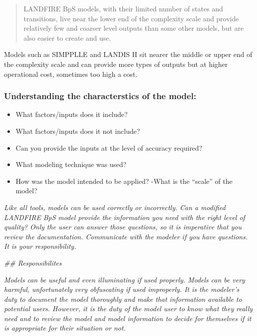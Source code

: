 \documentclass[
]{article}
\providecommand{\tightlist}{%
  \setlength{\itemsep}{0pt}\setlength{\parskip}{0pt}}
\begin{document}
\begin{quote}
LANDFIRE BpS models, with their limited number of states and
transitions, live near the lower end of the complexity scale and provide
relatively few and coarser level outputs than some other models, but are
also easier to create and use.
\end{quote}

Models such as SIMPPLLE and LANDIS II sit nearer the middle or upper end
of the complexity scale and can provide more types of outputs but at
higher operational cost, sometimes too high a cost.

\hypertarget{understanding-the-characterstics-of-the-model}{%
\subsubsection{Understanding the characterstics of the
model:}\label{understanding-the-characterstics-of-the-model}}

\begin{blue}

\begin{itemize}
\tightlist
\item
  What factors/inputs does it include?
\item
  What factors/inputs does it not include?
\item
  Can you provide the inputs at the level of accuracy required?
\item
  What modeling technique was used?
\item
  How was the model intended to be applied? -What is the ``scale'' of
  the model?
\end{itemize}

\end{blue}

\emph{Like all tools, models can be used correctly or incorrectly. Can a
modified LANDFIRE BpS model provide the information you need with the
right level of quality? Only the user can answer those questions, so it
is imperative that you review the documentation. Communicate with the
modeler if you have questions. It is your responsibility.}

\emph{\#\# Responsibilites}

\emph{Models can be useful and even illuminating if used properly.
Models can be very harmful, unfortunately very obfuscating if used
improperly. It is the modeler's duty to document the model thoroughly
and make that information available to potential users. However, it is
the duty of the model user to know what they really need and to review
the model and model information to decide for themselves if it is
appropriate for their situation or not.}
\end{document}
